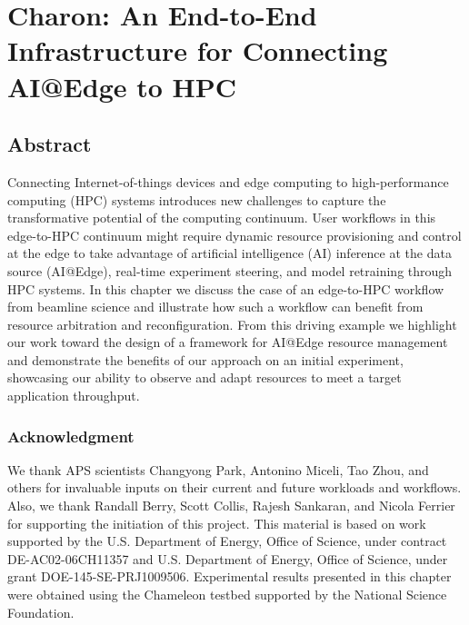 

\chapter{Charon: An End-to-End Infrastructure for Connecting AI@Edge to HPC} \label{CH6_Charon}

\graphicspath{{Papers/Charon/}}

\section*{Abstract}
Connecting Internet-of-things devices and edge computing to high-performance computing
(HPC) systems introduces new challenges to capture the transformative potential of
the computing continuum. User workflows in this edge-to-HPC continuum might require
dynamic resource provisioning and control at the edge to take advantage of artificial
intelligence (AI) inference at the data source (AI@Edge), real-time experiment
steering, and model retraining through HPC systems. In this chapter we discuss
the case of an edge-to-HPC workflow from beamline science and illustrate how
such a workflow can benefit from resource arbitration and reconfiguration. From
this driving example we highlight our work toward the design of a framework for
AI@Edge resource management and demonstrate the benefits of our approach on an
initial experiment, showcasing our ability to observe and adapt resources to meet
a target application throughput.













\subsection*{Acknowledgment}
We thank APS scientists Changyong Park, Antonino Miceli, Tao Zhou, and others for
invaluable inputs on their current and future workloads and workflows. Also, we
thank Randall Berry, Scott Collis, Rajesh Sankaran, and Nicola Ferrier for
supporting the initiation of this project. This material is based on work
supported by the U.S. Department of Energy, Office of Science, under contract
DE-AC02-06CH11357 and U.S. Department of Energy, Office of Science, under grant
DOE-145-SE-PRJ1009506. Experimental results presented in this chapter were
obtained using the Chameleon testbed supported by the National Science Foundation.
